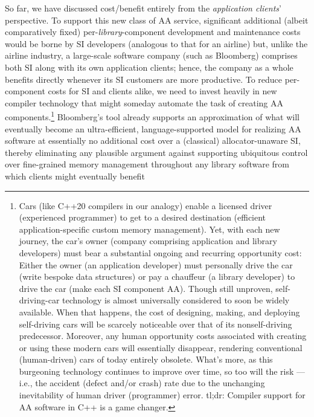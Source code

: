 So far, we have discussed cost/benefit entirely from the \emph{application clients}’
perspective. To support this new class of AA service, significant additional (albeit
comparatively fixed) per-\emph{library}-component development and maintenance costs
would be borne by SI developers (analogous to that for an airline) but, unlike the
airline industry, a large-scale software company (such as Bloomberg) comprises
both SI along with its own application clients; hence, the company as a whole
benefits directly whenever its SI customers are more productive. To reduce
per-component costs for SI and clients alike, we need to invest heavily in new compiler
technology that might someday automate the task of creating AA
components.\footnote{Cars (like C++20 compilers in our analogy) enable a licensed driver (experienced programmer) to
get to a desired destination (efficient application-specific custom memory management). Yet, with
each new journey, the car’s owner (company comprising application and library developers) must
bear a substantial ongoing and recurring opportunity cost: Either the owner (an application
developer) must personally drive the car (write bespoke data structures) or pay a chauffeur (a library
developer) to drive the car (make each SI component AA). Though still unproven, self-driving-car
technology is almost universally considered to soon be widely available. When that happens, the cost
of designing, making, and deploying self-driving cars will be scarcely noticeable over that of its
nonself-driving predecessor. Moreover, any human opportunity costs associated with creating or using
these modern cars will essentially disappear, rendering conventional (human-driven) cars of today
entirely obsolete. What's more, as this burgeoning technology continues to improve over time, so too
will the risk — i.e., the accident (defect and/or crash) rate due to the unchanging inevitability of
human driver (programmer) error. tl;dr: Compiler support for AA software in C++ is a game changer.}
Bloomberg’s  tool already supports an approximation of what will
eventually become an ultra-efficient, language-supported model for realizing AA
software at essentially no additional cost over a (classical) allocator-unaware SI,
thereby eliminating any plausible argument against supporting ubiquitous control
over fine-grained memory management throughout any library software from which
clients might eventually benefit

